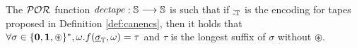 \begin{lemma}
  \label{lemma:dectape}
  The $\mathcal{POR}$ function $\mathit{dectape} :
  \mathbb{S} \longrightarrow \mathbb{S}$ is
  such that if ${\underline {\cdot}}_{\mathbb{T}}$ is the encoding for tapes
  proposed in Definition \ref{def:canencs}, then it holds that
  $\forall \sigma \in \{\mathbf{0}, \mathbf{1}, \circledast\}^*, \omega.
   f({\underline {\sigma}}_{\mathbb{T}}, \omega)=
  \tau$ and $\tau$ is the longest suffix of $\sigma$ without $\circledast$.
\end{lemma}
